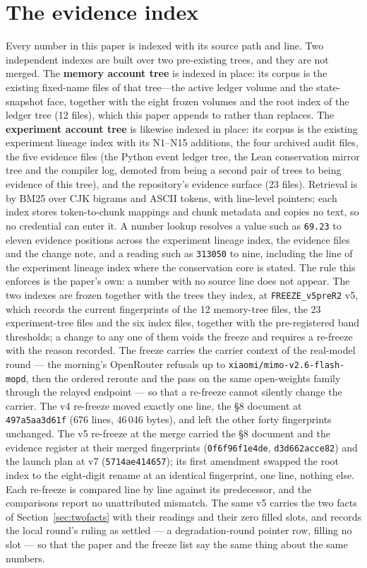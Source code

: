 \documentclass[11pt,a4paper]{article}
\begin{document}
\section{The evidence index}
\label{sec:rag}
Every number in this paper is indexed with its source path and line. Two independent indexes are built over two pre-existing trees, and they are not merged. The \textbf{memory account tree} is indexed in place: its corpus is the existing fixed-name files of that tree---the active ledger volume and the state-snapshot face, together with the eight frozen volumes and the root index of the ledger tree (12 files), which this paper appends to rather than replaces. The \textbf{experiment account tree} is likewise indexed in place: its corpus is the existing experiment lineage index with its N1--N15 additions, the four archived audit files, the five evidence files (the Python event ledger tree, the Lean conservation mirror tree and the compiler log, demoted from being a second pair of trees to being evidence of this tree), and the repository's evidence surface (23 files). Retrieval is by BM25 over CJK bigrams and ASCII tokens, with line-level pointers; each index stores token-to-chunk mappings and chunk metadata and copies no text, so no credential can enter it. A number lookup resolves a value such as \texttt{69.23} to eleven evidence positions across the experiment lineage index, the evidence files and the change note, and a reading such as \texttt{313050} to nine, including the line of the experiment lineage index where the conservation core is stated. The rule this enforces is the paper's own: a number with no source line does not appear. The two indexes are frozen together with the trees they index, at \texttt{FREEZE\_v5preR2} v5, which records the current fingerprints of the 12 memory-tree files, the 23 experiment-tree files and the six index files, together with the pre-registered band thresholds; a change to any one of them voids the freeze and requires a re-freeze with the reason recorded. The freeze carries the carrier context of the real-model round --- the morning's OpenRouter refusals up to \texttt{xiaomi/mimo-v2.6-flash-mopd}, then the ordered reroute and the pass on the same open-weights family through the relayed endpoint --- so that a re-freeze cannot silently change the carrier. The v4 re-freeze moved exactly one line, the \S 8 document at \texttt{497a5aa3d61f} (676 lines, 46\,046 bytes), and left the other forty fingerprints unchanged. The v5 re-freeze at the merge carried the \S 8 document and the evidence register at their merged fingerprints (\texttt{0f6f96f1e4de}, \texttt{d3d662acce82}) and the launch plan at v7 (\texttt{5714ae414657}); its first amendment swapped the root index to the eight-digit rename at an identical fingerprint, one line, nothing else. Each re-freeze is compared line by line against its predecessor, and the comparisons report no unattributed mismatch. The same v5 carries the two facts of Section~\ref{sec:twofacts} with their readings and their zero filled slots, and records the local round's ruling as settled --- a degradation-round pointer row, filling no slot --- so that the paper and the freeze list say the same thing about the same numbers.
\end{document}
